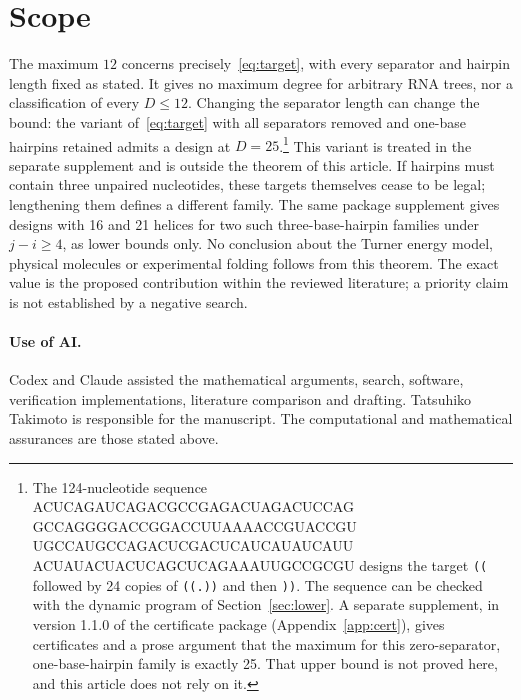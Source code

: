 \documentclass[11pt,a4paper]{article}
\theoremstyle{definition}
\begin{document}
\section{Scope}
The maximum $12$ concerns precisely~\eqref{eq:target}, with every
separator and hairpin length fixed as stated. It gives no maximum
degree for arbitrary RNA trees, nor a classification of every
$D\leq12$. Changing the separator length can change the bound: the
variant of~\eqref{eq:target} with all separators removed and one-base
hairpins retained admits a design at $D=25$.\footnote{\raggedright The 124-nucleotide sequence
{\ttfamily\footnotesize
ACUCAGAUCAGACGCCGAGACUAGACUCCAG\allowbreak{}
GCCAGGGGACCGGACCUUAAAACCGUACCGU\allowbreak{}
UGCCAUGCCAGACUCGACUCAUCAUAUCAUU\allowbreak{}
ACUAUACUACUCAGCUCAGAAAUUGCCGCGU}
designs the target \texttt{((} followed by 24 copies of \texttt{((.))} and then \texttt{))}. The sequence can be checked with the dynamic program of Section~\ref{sec:lower}. A separate supplement,  in version 1.1.0 of the certificate package (Appendix~\ref{app:cert}), gives certificates and a prose argument that the maximum for this zero-separator, one-base-hairpin family is exactly 25. That upper bound is not proved here, and this article does not rely on it.} This variant is treated in the separate supplement and is outside
the theorem of this article. If hairpins must contain three unpaired nucleotides, these
targets themselves cease to be legal; lengthening them defines a
different family. The same package supplement gives designs with 16 and 21 helices for two such three-base-hairpin families under $j-i\geq4$, as lower bounds only. No conclusion about the Turner energy model,
physical molecules or experimental folding follows from this theorem.
The exact value is the proposed contribution within the reviewed
literature; a priority claim is not established by a negative search.

\paragraph{Use of AI.}
Codex and Claude assisted the mathematical arguments, search, software,
verification implementations, literature comparison and drafting.
Tatsuhiko Takimoto is responsible for the manuscript. The computational
and mathematical assurances are those stated above.
\end{document}
